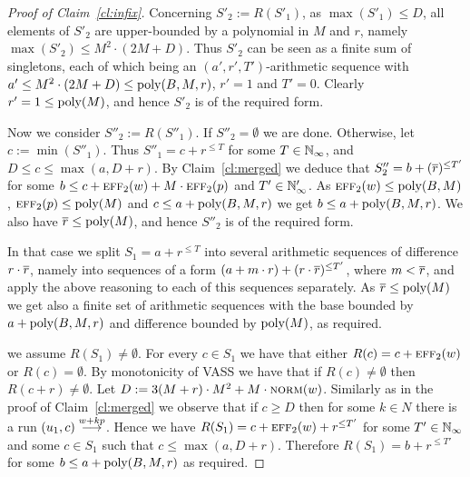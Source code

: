 \begin{proof}[Proof of Claim~\ref{cl:infix}]
Concerning $S'_2:= R(S'_1)$,
as $\max(S'_1) \leq D$, all
elements of $S'_2$ are upper-bounded by a polynomial in $M$ and $r$, namely
$\max(S'_2) \leq M^2 \cdot (2M + D)$. 
Thus $S'_2$ can be seen as a finite sum of singletons, each of which
being an $(a', r', T')$-arithmetic sequence with $a' \leq M^2 \cdot (2M + D) \leq \textup{poly}(B,M,r)$,
$r' = 1$ and $T' = 0$. 
Clearly $r' = 1 \leq \textup{poly}(M)$, and hence $S'_2$ is of the required form.

Now we consider $S''_2:= R(S''_1)$.
If $S''_2 = \emptyset$ we are done.
Otherwise, let $c:= \min(S''_1)$.
Thus $S''_1 = c+r^{\leq T}$ for some $T \in \mathbb{N}_\infty$, 
and $D\leq c \leq \max(a, D+r)$.
By Claim~\ref{cl:merged} we deduce that
$S''_2 = b + (\overline{r})^{\leq T'}$ for some 
$b \leq c + \textsc{eff}_2(w) + M \cdot \textsc{eff}_2(p)$ and $T' \in \mathbb{N}_\infty'$. 
As $\textsc{eff}_2(w) \leq \textup{poly}(B,M)$, $\textsc{eff}_2(p) \leq \textup{poly}(M)$ and $c \leq a + \textup{poly}(B,M, r)$ we get $b \leq a + \textup{poly}(B, M, r)$.
We also have $\overline{r} \leq \textup{poly}(M)$, and hence
$S''_2$ is of the required form.



In that case we split $S_1 = a + r^{\leq T}$ into several
arithmetic sequences of difference $r \cdot \overline{r}$, namely into sequences of a form 
$(a + m \cdot r) + (r \cdot \overline{r})^{\leq T'}$, where $m < \overline{r}$, 
and apply the above reasoning to each of this sequences separately. 
As $\overline{r} \leq \textup{poly}(M)$
we get also a finite set of arithmetic sequences with the base bounded by $a + \textup{poly}(B, M,r)$ and difference bounded by $\textup{poly}(M)$,
as required.

\Wlog we assume $R(S_1) \neq \emptyset$. For every $c \in S_1$ we have that either $R(c) = c + \textsc{eff}_2(w)$ or $R(c) = \emptyset$. By monotonicity of VASS we have that if $R(c) \neq \emptyset$ then $R(c+r) \neq \emptyset$. Let $D := 3(M+r) \cdot M^2 + M \cdot \textsc{norm}(w)$. Similarly as in the proof of Claim~\ref{cl:merged} we observe that if $c \geq D$ then for some $k \in N$ there is a run $(u_1, c) \stackrel{w+kp}{\longrightarrow}$. Hence we have $R(S_1) = c + \textsc{eff}_2(w) + r^{\leq T'}$ for some $T' \in \mathbb{N}_\infty$ and some $c \in S_1$ such that $c \leq \max(a, D+r)$. Therefore $R(S_1) = b + r^{\leq T'}$ for some $b \leq a + \textup{poly}(B,M,r)$ as required.

\end{proof}



